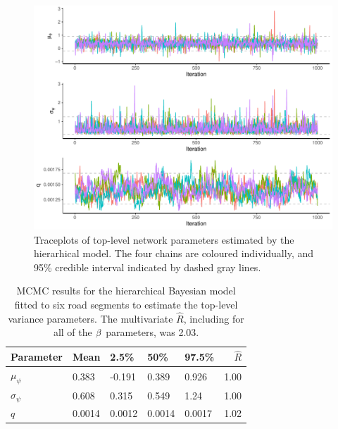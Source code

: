 \begin{knitrout}\small
{}\color{fgcolor}\begin{figure}

{\centering \includegraphics[width=\textwidth]{figure/nw_model_n2_diag-1} 

}

\caption[Traceplots of top-level network parameters estimated by the hierarhical model]{Traceplots of top-level network parameters estimated by the hierarhical model. The four chains are coloured individually, and 95\% credible interval indicated by dashed gray lines.}\label{fig:nw_model_n2_diag}
\end{figure}


\end{knitrout}


\begin{table}

\caption[MCMC results for the hierarchical Bayesian model fitted to six road segments to estimate the top-level variance parameters]{\label{tab:nw_model_n2_smry}MCMC results for the hierarchical Bayesian model fitted to six road segments to estimate the top-level variance parameters. The multivariate $\hat R$, including for all of the $\beta$ parameters, was 2.03.}
\centering
\begin{tabular}[b]{lllllr}
\toprule
Parameter & Mean & 2.5\% & 50\% & 97.5\% & $\hat R$\\
\midrule
$\mu_\psi$ & 0.383 & -0.191 & 0.389 & 0.926 & 1.00\\
$\sigma_\psi$ & 0.608 & 0.315 & 0.549 & 1.24 & 1.00\\
$q$ & 0.0014 & 0.0012 & 0.0014 & 0.0017 & 1.02\\
\bottomrule
\end{tabular}
\end{table}




